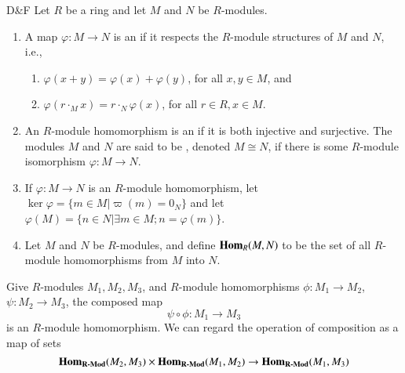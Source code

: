 \documentclass[12pt, a4paper, twoside, openright, titlepage]{book}
\begin{document}
\begin{defn}{D\&F}{}
    Let $R$ be a ring and let $M$ and $N$ be $R$-modules.
    \begin{enumerate}
        \item A map $\varphi:M\rightarrow N$ is an  if it respects the $R$-module structures of $M$ and $N$, i.e., \begin{enumerate}
                \item $\varphi(x+y) = \varphi(x)+\varphi(y)$, for all $x,y  \in M$, and 
                \item $\varphi(r\cdot_Mx) = r\cdot_N\varphi(x)$, for all $r \in R, x \in M$.
        \end{enumerate}
        \item An $R$-module homomorphism is an  if it is both injective and surjective. The modules $M$ and $N$ are said to be , denoted $M\cong N$, if there is some $R$-module isomorphism $\varphi:M\rightarrow N$.
        \item If $\varphi:M\rightarrow N$ is an $R$-module homomorphism, let $\ker\varphi = \{m \in M\vert \varpi(m) = 0_N\}$ and let $\varphi(M) = \{n \in N\vert \exists m \in M; n = \varphi(m)\}$.
        \item Let $M$ and $N$ be $R$-modules, and define $\mathbf{Hom}_R(M,N)$ to be the set of all $R$-module homomorphisms from $M$ into $N$.
    \end{enumerate}
\end{defn}


\begin{rmk}{}{}
    Give $R$-modules $M_1,M_2,M_3$, and $R$-module homomorphisms $\phi:M_1\rightarrow M_2$, $\psi:M_2\rightarrow M_3$, the composed map \begin{equation}
        \psi \circ \phi:M_1\rightarrow M_3
    \end{equation}
    is an $R$-module homomorphism. We can regard the operation of composition as a map of sets \begin{equation}
        \mathbf{Hom}_{\normalfont\textbf{R-Mod}}(M_2,M_3)\times\mathbf{Hom}_{\normalfont\textbf{R-Mod}}(M_1,M_2) \rightarrow \mathbf{Hom}_{\normalfont\textbf{R-Mod}}(M_1,M_3)
    \end{equation}
\end{rmk}
\end{document}
